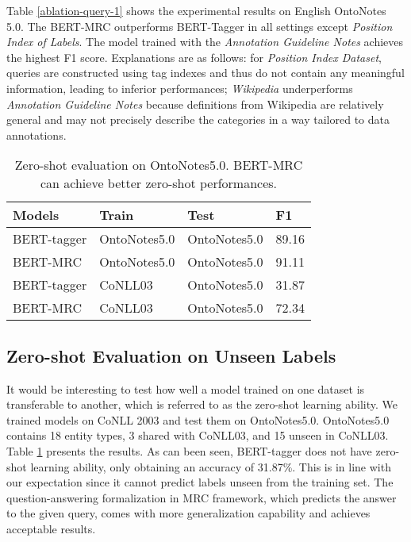 \documentclass[11pt,a4paper]{article}
\begin{document}
Table \ref{ablation-query-1} shows the experimental results on English OntoNotes 5.0. 
The BERT-MRC outperforms BERT-Tagger in all settings except  {\em Position Index of Labels}.
The model trained with the {\em Annotation Guideline Notes} achieves the highest F1 score.
Explanations are as follows: 
for {\em  Position Index Dataset}, 
queries are constructed using tag indexes and  thus do not contain any meaningful information, leading to inferior performances;  
{\em Wikipedia}  underperforms {\em Annotation Guideline Notes} because 
definitions from Wikipedia are relatively general and may not precisely describe the categories in a way tailored to data annotations.  





\begin{table}
\small
\center
\begin{tabular}{l|l|l|l}\toprule
{\bf Models} & {\bf Train} & {\bf Test} & {\bf F1} \\\bottomrule 
BERT-tagger &  OntoNotes5.0 & OntoNotes5.0  &89.16  \\
BERT-MRC &  OntoNotes5.0 & OntoNotes5.0  & 91.11  \\\hline
BERT-tagger &  CoNLL03 & OntoNotes5.0  & 31.87  \\
BERT-MRC &  CoNLL03 & OntoNotes5.0  &  72.34\\\bottomrule
\end{tabular}
\caption{Zero-shot evaluation on OntoNotes5.0. BERT-MRC can achieve better zero-shot performances.}
\label{zero-shot-table}
\end{table}

\subsection{Zero-shot Evaluation on Unseen Labels}
It would be interesting to test how well a model trained on one dataset is transferable to another, 
which is 
referred to as the zero-shot learning ability. 
We trained models on CoNLL 2003  
and test them on  OntoNotes5.0. 
OntoNotes5.0 contains 18 entity types, 3 shared with CoNLL03, and 15 unseen in CoNLL03. 
Table \ref{zero-shot-table} presents the results. As can been seen, BERT-tagger does not have zero-shot learning ability,
only obtaining an accuracy of 31.87\%.
This is in line with our expectation since it cannot 
predict  labels unseen from the training set. 
The question-answering 
formalization in 
MRC framework, which predicts the answer to the given query, comes with more generalization capability and achieves acceptable results. 
\end{document}
